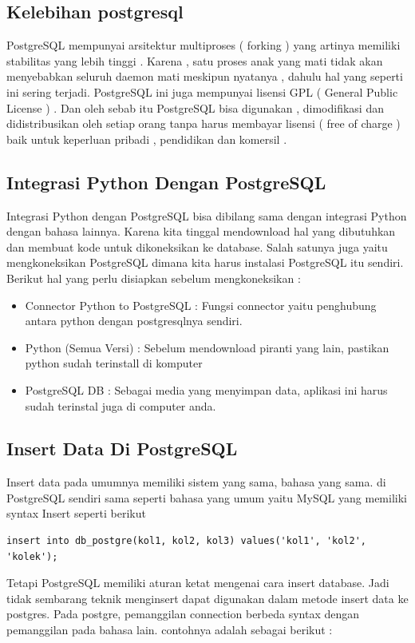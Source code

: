 \subsection { Kelebihan postgresql }
PostgreSQL mempunyai arsitektur multiproses ( forking ) yang artinya memiliki stabilitas yang lebih tinggi . Karena , satu proses anak yang mati tidak akan menyebabkan seluruh daemon mati meskipun nyatanya , dahulu hal yang seperti ini sering terjadi. PostgreSQL ini juga mempunyai lisensi GPL ( General Public License ) . Dan oleh sebab itu PostgreSQL bisa digunakan , dimodifikasi dan didistribusikan oleh setiap orang tanpa harus membayar lisensi ( free of charge ) baik untuk keperluan pribadi , pendidikan dan komersil .

\subsection{Integrasi Python Dengan PostgreSQL} 
Integrasi Python dengan PostgreSQL bisa dibilang sama dengan integrasi Python dengan bahasa lainnya.  Karena kita tinggal mendownload hal yang dibutuhkan dan membuat kode untuk dikoneksikan ke database. Salah satunya juga yaitu mengkoneksikan PostgreSQL dimana kita harus instalasi PostgreSQL itu sendiri. Berikut hal yang perlu disiapkan sebelum mengkoneksikan : 
\begin{itemize}
\item Connector Python to PostgreSQL : Fungsi connector yaitu penghubung antara python dengan postgresqlnya sendiri. 
\item Python (Semua Versi) : Sebelum mendownload piranti yang lain, pastikan python sudah terinstall di komputer
\item PostgreSQL DB : Sebagai media yang menyimpan data, aplikasi ini harus sudah terinstal juga di computer anda.
\end{itemize}

\subsection{Insert Data Di PostgreSQL}
Insert data pada umumnya memiliki sistem yang sama, bahasa yang sama. di PostgreSQL sendiri sama seperti bahasa yang umum yaitu MySQL yang memiliki syntax Insert seperti berikut
\begin{verbatim}
insert into db_postgre(kol1, kol2, kol3) values('kol1', 'kol2', 'kolek');
\end{verbatim}
Tetapi PostgreSQL memiliki aturan ketat mengenai cara insert database. Jadi tidak sembarang teknik menginsert dapat digunakan dalam metode insert data ke postgres. Pada postgre, pemanggilan connection berbeda syntax dengan pemanggilan pada bahasa lain. contohnya adalah sebagai berikut : 

